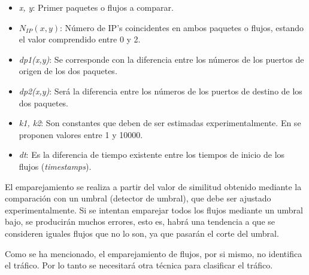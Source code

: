 \begin{itemize}
\item \textit{x, y}: Primer paquetes o flujos a comparar.
\item \textit{$N_{IP}(x,y)$}: Número de IP's coincidentes en ambos paquetes o flujos, estando el valor comprendido entre 0 y 2.
\item \textit{dp1(x,y)}: Se corresponde con la diferencia entre los números de los puertos de origen de los dos paquetes.
\item \textit{dp2(x,y)}: Será la diferencia entre los números de los puertos de destino de los dos paquetes.
\item \textit{k1, k2}: Son constantes que deben de ser estimadas experimentalmente. En \cite{comparacion} se proponen valores entre 1 y 10000.
\item \textit{dt}: Es la diferencia de tiempo existente entre los tiempos de inicio de los flujos (\textit{timestamps}).
\end{itemize}

\intro El emparejamiento se realiza a partir del valor de similitud obtenido mediante la comparación con un umbral (detector de 
umbral), que debe ser ajustado experimentalmente. Si se intentan emparejar todos los flujos mediante un umbral bajo, se producirán 
muchos errores, esto es, habrá una tendencia a que se consideren iguales flujos que no lo son, ya que pasarán el corte del umbral.

\intro Como se ha mencionado, el emparejamiento de flujos, por si mismo, no identifica el tráfico. Por lo tanto se 
necesitará otra técnica para clasificar el tráfico.
